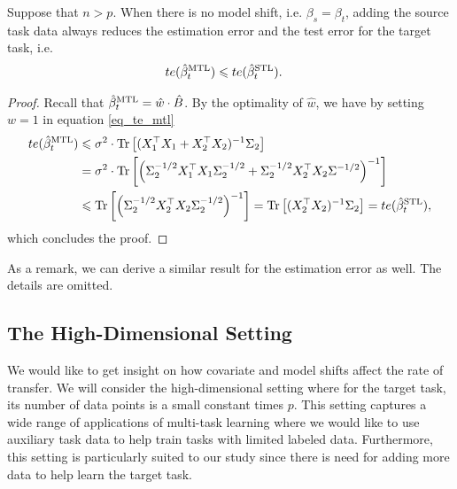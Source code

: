\begin{proposition}\label{prop_monotone}
	Suppose that $n > p$.
  When there is no model shift, i.e. $\beta_s = \beta_t$, adding the source task data always reduces the estimation error and the test error for the target task, i.e.
	\begin{align}
		te(\hat{\beta}_{t}^{\text{MTL}}) &\leqslant te(\hat{\beta}_t^{\text{STL}}). \label{eq_mono_te}
	\end{align}
\end{proposition}

\begin{proof}
	Recall that $\hat{\beta}_t^{\text{MTL}} = \hat{w} \cdot \hat{B}$.
	By the optimality of $\hat{w}$, we have by setting $w = 1$ in equation \eqref{eq_te_mtl}
	\begin{align*}
		te(\hat{\beta}_t^{\text{MTL}}) &\leqslant \sigma^2 \cdot \operatorname{Tr}\left[(X_1^{\top}X_1 + X_2^{\top}X_2)^{-1}\Sigma_2\right] \\
		&= \sigma^2 \cdot \operatorname{Tr}\left[\left({\Sigma_2^{-1/2}X_1^{\top}X_1\Sigma_2^{-1/2} + \Sigma_2^{-1/2}X_2^{\top}X_2\Sigma^{-1/2}}\right)^{-1}\right] \\
		&\leqslant \operatorname{Tr}\left[\left({\Sigma_2^{-1/2}X_2^{\top}X_2\Sigma_2^{-1/2}}\right)^{-1}\right]
			= \operatorname{Tr}\left[(X_2^{\top}X_2)^{-1} \Sigma_2\right] = te(\hat{\beta}_t^{\text{STL}}),
	\end{align*}
	which concludes the proof.
\end{proof}

As a remark, we can derive a similar result for the estimation error as well. The details are omitted.


\subsection{The High-Dimensional Setting}

We would like to get insight on how covariate and model shifts affect the rate of transfer.
We will consider the high-dimensional setting where for the target task, its number of data points is a small constant times $p$.
This setting captures a wide range of applications of multi-task learning where we would like to use auxiliary task data to help train tasks with limited labeled data.
Furthermore, this setting is particularly suited to our study since there is need for adding more data to help learn the target task.

